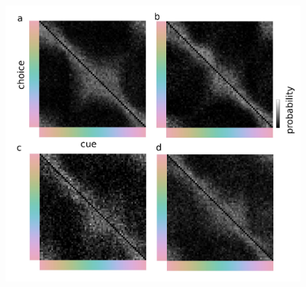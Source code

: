 \begin{figure}
    \centering
    \begin{fullwidth}
    \includegraphics[width=\textwidth+4cm]{../Figures/flat/SI6_choiceMatrices.jpg}
    \label{fig:choiceProbabilityMatrices}
    \end{fullwidth}
\end{figure}


